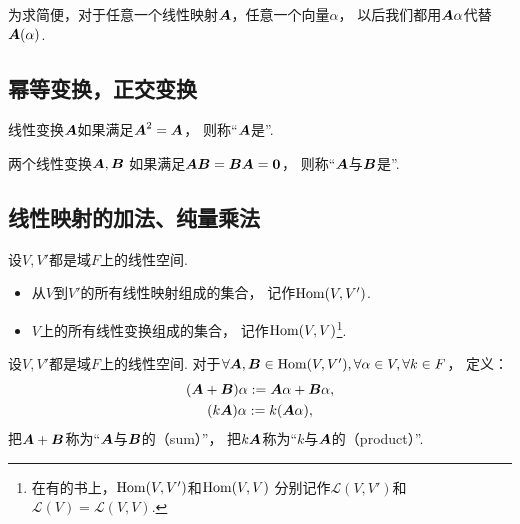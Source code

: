 为求简便，对于任意一个线性映射\(\boldsymbol{A}\)，任意一个向量\(\alpha\)，
以后我们都用\(\boldsymbol{A}\alpha\)代替\(\boldsymbol{A}(\alpha)\).

\subsection{幂等变换，正交变换}
\begin{definition}
线性变换\(\boldsymbol{A}\)如果满足\(\boldsymbol{A}^2=\boldsymbol{A}\)，
则称“\(\boldsymbol{A}\)是”.
\end{definition}

\begin{definition}
两个线性变换\(\boldsymbol{A},\boldsymbol{B}\)
如果满足\(\boldsymbol{A} \boldsymbol{B}=\boldsymbol{B} \boldsymbol{A}=\boldsymbol0\)，
则称“\(\boldsymbol{A}\)与\(\boldsymbol{B}\)是”.
\end{definition}

\subsection{线性映射的加法、纯量乘法}
\begin{definition}
设\(V,V'\)都是域\(F\)上的线性空间.

\begin{itemize}
	\item 从\(V\)到\(V'\)的所有线性映射组成的集合，
	记作\(\operatorname{Hom}(V,V')\).

	\item \(V\)上的所有线性变换组成的集合，
	记作\(\operatorname{Hom}(V,V)\)\footnote{
		在有的书上，\(\operatorname{Hom}(V,V')\)和\(\operatorname{Hom}(V,V)\)
		分别记作\(\mathcal{L}(V,V')\)和\(\mathcal{L}(V) = \mathcal{L}(V,V)\).
	}.
\end{itemize}
\end{definition}

\begin{definition}
设\(V,V'\)都是域\(F\)上的线性空间.
对于\(\forall\boldsymbol{A},\boldsymbol{B}\in\operatorname{Hom}(V,V'),
\forall\alpha\in V,
\forall k\in F\)，
定义：\begin{gather*}
	(\boldsymbol{A}+\boldsymbol{B})\alpha
	:=
	\boldsymbol{A}\alpha+\boldsymbol{B}\alpha, \\
	(k\boldsymbol{A})\alpha
	:=
	k(\boldsymbol{A}\alpha),
\end{gather*}
把\(\boldsymbol{A}+\boldsymbol{B}\)称为“\(\boldsymbol{A}\)与\(\boldsymbol{B}\)的（sum）”，
把\(k\boldsymbol{A}\)称为“\(k\)与\(\boldsymbol{A}\)的（product）”.
\end{definition}

